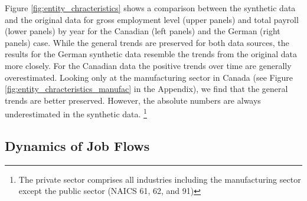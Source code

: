Figure \ref{fig:entity_chracteristics} shows a comparison between the synthetic data and the original data for gross employment level (upper panels) and total payroll (lower panels) by year for the Canadian (left panels) and the German (right panels) case. While the general trends are preserved for both data sources, the results for the German synthetic data resemble the trends from the original data more closely. For the Canadian data the positive trends over time are generally overestimated. Looking only at the manufacturing sector in Canada (see Figure \ref{fig:entity_chracteristics_manufac} in the Appendix), we find that the general trends are better preserved. However, the absolute numbers are always underestimated in the synthetic data.
\footnote{The private sector comprises all industries including the manufacturing sector except the public sector  (NAICS 61, 62, and 91)} 





\subsection{Dynamics of Job Flows}


